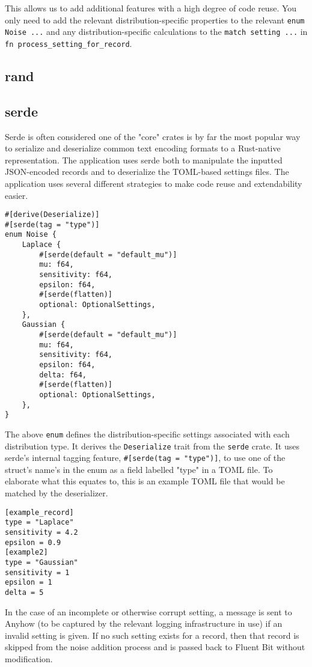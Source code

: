 This allows us to add additional features with a high degree of code reuse. You only need to add the relevant distribution-specific properties to the relevant \texttt{enum Noise {...}} and any distribution-specific calculations to the \texttt{match setting {...}} in \texttt{fn process\_setting\_for\_record}. 

\subsection{rand}

\subsection{serde}
Serde is often considered one of the "core" crates is by far the most popular way to serialize and deserialize common text encoding formats to a Rust-native representation. The application uses serde both to manipulate the inputted JSON-encoded records and to deserialize the TOML-based settings files. The application uses several different strategies to make code reuse and extendability easier.

\begin{verbatim}
#[derive(Deserialize)]
#[serde(tag = "type")]
enum Noise {
    Laplace {
        #[serde(default = "default_mu")]
        mu: f64,
        sensitivity: f64,
        epsilon: f64,
        #[serde(flatten)]
        optional: OptionalSettings,
    },
    Gaussian {
        #[serde(default = "default_mu")]
        mu: f64,
        sensitivity: f64,
        epsilon: f64,
        delta: f64,
        #[serde(flatten)]
        optional: OptionalSettings,
    },
}
\end{verbatim}
The above \texttt{enum} defines the distribution-specific settings associated with each distribution type. It derives the \texttt{Deserialize} trait from the \texttt{serde} crate. It uses serde's internal tagging feature, \texttt{\#[serde(tag = "type")]}, to use one of the struct's name's in the enum as a field labelled "type" in a TOML file. To elaborate what this equates to, this is an example TOML file that would be matched by the deserializer.
\begin{verbatim}
[example_record]
type = "Laplace"
sensitivity = 4.2
epsilon = 0.9
[example2]
type = "Gaussian"
sensitivity = 1
epsilon = 1
delta = 5
\end{verbatim}
In the case of an incomplete or otherwise corrupt setting, a message is sent to Anyhow (to be captured by the relevant logging infrastructure in use) if an invalid setting is given. If no such setting exists for a record, then that record is skipped from the noise addition process and is passed back to Fluent Bit without modification. 

